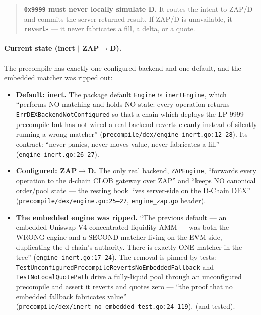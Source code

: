 \begin{quote}
\textbf{\texttt{0x9999} must never locally simulate D.} It routes the
intent to ZAP/D and commits the server-returned result. If ZAP/D is
unavailable, it \textbf{reverts} --- it never fabricates a fill, a
delta, or a quote.
\end{quote}

\paragraph{Current state \IMPL{} (inert $\mid$ ZAP$\to$D).} The
precompile has exactly one configured backend and one default, and the
embedded matcher was ripped out:

\begin{itemize}[leftmargin=2em,nosep]
\item \textbf{Default: inert.} The package default \texttt{Engine} is
  \texttt{inertEngine}, which ``performs NO matching and holds NO
  state: every operation returns \texttt{ErrDEXBackendNotConfigured} so
  that a chain which deploys the LP-9999 precompile but has not wired a
  real backend reverts cleanly instead of silently running a wrong
  matcher'' (\texttt{precompile/dex/engine\_inert.go:12--28}). Its
  contract: ``never panics, never moves value, never fabricates a
  fill'' (\texttt{engine\_inert.go:26--27}). \IMPL{}
\item \textbf{Configured: ZAP$\to$D.} The only real backend,
  \texttt{ZAPEngine}, ``forwards every operation to the d-chain CLOB
  gateway over ZAP'' and ``keeps NO canonical order/pool state --- the
  resting book lives server-side on the D-Chain DEX''
  (\texttt{precompile/dex/engine.go:25--27},
  \texttt{engine\_zap.go} header). \IMPL{}
\item \textbf{The embedded engine was ripped.} ``The previous default
  --- an embedded Uniswap-V4 concentrated-liquidity AMM --- was both
  the WRONG engine and a SECOND matcher living on the EVM side,
  duplicating the d-chain's authority. There is exactly ONE matcher in
  the tree'' (\texttt{engine\_inert.go:17--24}). The removal is pinned
  by tests: \texttt{TestUnconfiguredPrecompileRevertsNoEmbeddedFallback}
  and \texttt{TestNoLocalQuotePath} drive a fully-liquid pool through an
  unconfigured precompile and assert it reverts and quotes zero ---
  ``the proof that no embedded fallback fabricates value''
  (\texttt{precompile/dex/inert\_no\_embedded\_test.go:24--119}).
  \IMPL{} (and tested).
\end{itemize}

